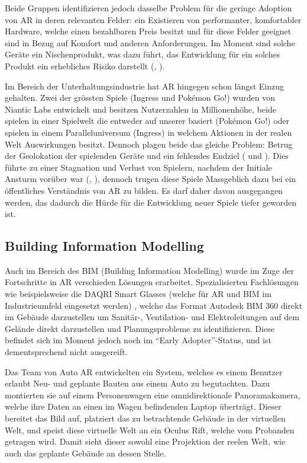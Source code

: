 \documentclass[a4paper]{scrreprt}
\begin{document}
Beide Gruppen identifizieren jedoch dasselbe Problem für die geringe Adoption von AR in deren relevanten Felder: ein Existieren von performanter, komfortabler Hardware, welche einen bezahlbaren Preis besitzt und für diese Felder geeignet sind in Bezug auf Komfort und anderen Anforderungen. Im Moment sind solche Geräte ein Nischenprodukt, was dazu führt, das Entwicklung für ein solches Produkt ein erhebliches Risiko darstellt (\cite{Piroozfar2018}, \cite{Pelargos2017}).

Im Bereich der Unterhaltungsindustrie hat AR hingegen schon längst Einzug gehalten. Zwei der grössten Spiele (Ingress und Pokémon Go!) wurden von Niantic Labs entwickelt und besitzen Nutzerzahlen in Millionenhöhe, beide spielen in einer Spielwelt die entweder auf unserer basiert (Pokémon Go!) oder spielen in einem Paralleluniversum (Ingress) in welchem Aktionen in der realen Welt Auswirkungen besitzt. Dennoch plagen beide das gleiche Problem: Betrug der Geolokation der spielenden Geräte und ein fehlendes Endziel (\cite{MRRX2015} und \cite{KamelBoulos2017}). Dies führte zu einer Stagnation und Verlust von Spielern, nachdem der Initiale Ansturm vorüber war (\cite{Arif2017}, \cite{KamelBoulos2017}), dennoch trugen diese Spiele Massgeblich dazu bei ein öffentliches Verständnis von AR zu bilden. Es darf daher davon ausgegangen werden, das dadurch die Hürde für die Entwicklung neuer Spiele tiefer geworden ist.

\subsection{Building Information Modelling}

Auch im Bereich des BIM (Building Information Modelling) wurde im Zuge der Fortschritte in AR verschieden Lösungen erarbeitet. Spezialisierten Fachlösungen wie beispielsweise die DAQRI Smart Glasses (welche für AR und BIM im Industrieumfeld eingesetzt werden) \parencite{DAQRI2018}, welche das Format Autodesk BIM 360 direkt im Gebäude darzustellen um Sanitär-, Ventilation- und Elektroleitungen auf dem Gelände direkt darzustellen und Planungsprobleme zu identifizieren. Diese befindet sich im Moment jedoch noch im \textquotedblleft Early Adopter\textquotedblright-Status, und ist dementsprechend nicht ausgereift.

Das Team von Auto AR \parencite{Opperman2015} entwickelten ein System, welches es einem Benutzer erlaubt Neu- und geplante Bauten aus einem Auto zu begutachten. Dazu montierten sie auf einem Personenwagen eine omnidirektionale Panoramakamera, welche ihre Daten an einen im Wagen befindenden Laptop überträgt. Dieser bereitet das Bild auf, platziert das zu betrachtende Gebäude in der virtuellen Welt, und speist diese virtuelle Welt an ein Oculus Rift, welche vom Probanden getragen wird. Damit sieht dieser sowohl eine Projektion der reelen Welt, wie auch das geplante Gebäude an dessen Stelle.
\end{document}
